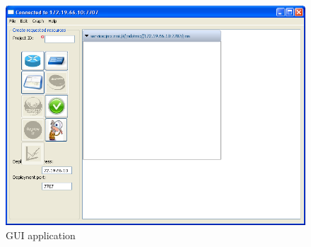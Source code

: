 \documentclass[11pt]{book}
\begin{document}
		\begin{figure}[H]
			\begin{center}
				\includegraphics[width=1.0\textwidth]{img/impl/gui.png}
			\end{center}
			\caption{GUI application}
		\end{figure}
\end{document}
